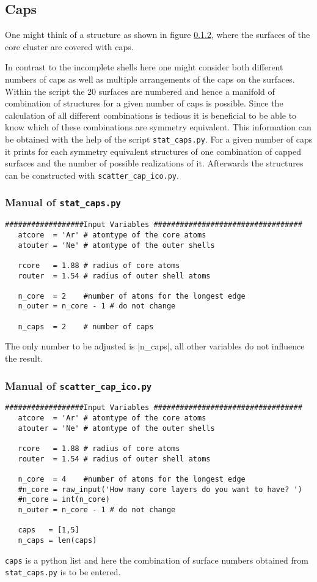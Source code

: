 \subsection{Caps}
One might think of a structure as shown in figure \ref{}, where the
surfaces of the core cluster are covered with caps.

In contrast to the incomplete shells here one might consider both different
numbers of caps as well as multiple arrangements of the caps on the surfaces.
Within the script the 20 surfaces are numbered and hence a manifold of
combination of structures for a given number of caps is possible.
Since the calculation of all different combinations is tedious
it is beneficial to be able to know which of these combinations are symmetry
equivalent. This information can be obtained with the help of the script
\lstinline|stat_caps.py|. For a given number of caps it prints for each
symmetry equivalent structures of one combination of capped surfaces
and the number of possible realizations of it. Afterwards the structures
can be constructed with \lstinline|scatter_cap_ico.py|.

\subsubsection{Manual of \lstinline|stat_caps.py|}
\begin{lstlisting}
##################Input Variables ##################################
   atcore  = 'Ar' # atomtype of the core atoms
   atouter = 'Ne' # atomtype of the outer shells
   
   rcore   = 1.88 # radius of core atoms
   router  = 1.54 # radius of outer shell atoms
   
   n_core  = 2    #number of atoms for the longest edge
   n_outer = n_core - 1 # do not change
   
   n_caps  = 2    # number of caps
\end{lstlisting}
The only number to be adjusted is \lstinlinine|n_caps|, all other variables
do not influence the result.


\subsubsection{Manual of \lstinline|scatter_cap_ico.py|}
\begin{lstlisting}
##################Input Variables ##################################
   atcore  = 'Ar' # atomtype of the core atoms
   atouter = 'Ne' # atomtype of the outer shells
   
   rcore   = 1.88 # radius of core atoms
   router  = 1.54 # radius of outer shell atoms
   
   n_core  = 4    #number of atoms for the longest edge
   #n_core = raw_input('How many core layers do you want to have? ')
   #n_core = int(n_core)
   n_outer = n_core - 1 # do not change
   
   caps   = [1,5]
   n_caps = len(caps)
\end{lstlisting}
\lstinline|caps| is a python list and here the combination of surface
numbers obtained from \lstinline|stat_caps.py| is to be entered.



